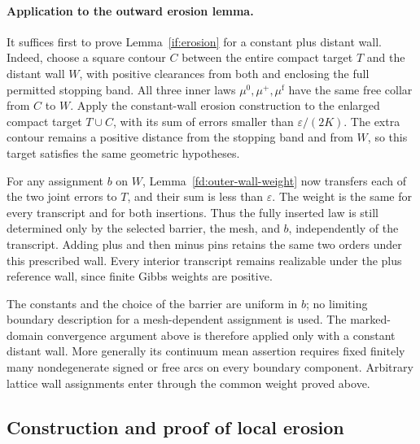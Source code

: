 \paragraph{Application to the outward erosion lemma.}
It suffices first to prove Lemma~\ref{if:erosion} for a constant plus
distant wall. Indeed, choose a square contour $C$ between the entire
compact target $T$ and the distant wall $W$, with positive clearances
from both and enclosing the full permitted stopping band. All three
inner laws $\mu^0,\mu^+,\mu^{\mathrm f}$ have the same free collar
from $C$ to $W$. Apply the constant-wall erosion construction to the
enlarged compact target $T\cup C$, with its sum of errors smaller than
$\varepsilon/(2K)$. The extra contour remains a positive distance from
the stopping band and from $W$, so this target satisfies the same
geometric hypotheses.

For any assignment $b$ on $W$, Lemma~\ref{fd:outer-wall-weight} now
transfers each of the two joint errors to $T$, and their sum is less
than $\varepsilon$. The weight is the same for every transcript and
for both insertions. Thus the fully inserted law is still determined
only by the selected barrier, the mesh, and $b$, independently of the
transcript. Adding plus and then minus pins retains the same two
orders under this prescribed wall. Every interior transcript remains
realizable under the plus reference wall, since finite Gibbs weights
are positive.

The constants and the choice of the barrier are uniform in $b$; no
limiting boundary description for a mesh-dependent assignment is used.
The marked-domain convergence argument above is therefore applied only
with a constant distant wall. More generally its continuum mean assertion
requires fixed finitely many nondegenerate signed or free arcs on every
boundary component. Arbitrary lattice wall assignments enter through
the common weight proved above.

\subsection{Construction and proof of local erosion}

